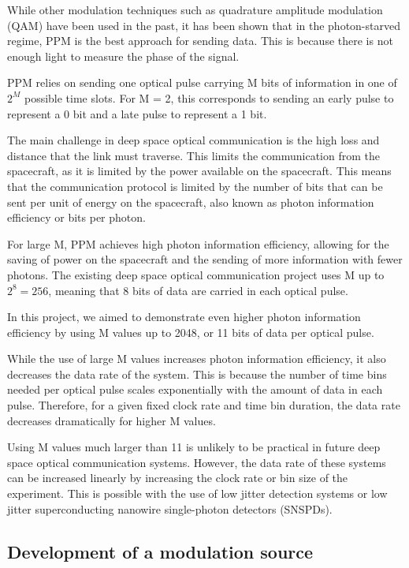 \documentclass[12pt]{caltech_thesis}
\begin{document}
While other modulation techniques such as quadrature amplitude
modulation (QAM) have been used in the past, it has been shown that in
the photon-starved regime, PPM is the best approach for sending data.
This is because there is not enough light to measure the phase of the
signal.

PPM relies on sending one optical pulse carrying M bits of information
in one of \(2^M\) possible time slots. For M = 2, this corresponds to
sending an early pulse to represent a 0 bit and a late pulse to
represent a 1 bit.

The main challenge in deep space optical communication is the high loss
and distance that the link must traverse. This limits the communication
from the spacecraft, as it is limited by the power available on the
spacecraft. This means that the communication protocol is limited by the
number of bits that can be sent per unit of energy on the spacecraft,
also known as photon information efficiency or bits per photon.

For large M, PPM achieves high photon information efficiency, allowing
for the saving of power on the spacecraft and the sending of more
information with fewer photons. The existing deep space optical
communication project uses M up to \(2^8 = 256\), meaning that 8 bits of
data are carried in each optical pulse.

In this project, we aimed to demonstrate even higher photon information
efficiency by using M values up to 2048, or 11 bits of data per optical
pulse.

While the use of large M values increases photon information efficiency,
it also decreases the data rate of the system. This is because the
number of time bins needed per optical pulse scales exponentially with
the amount of data in each pulse. Therefore, for a given fixed clock
rate and time bin duration, the data rate decreases dramatically for
higher M values.

Using M values much larger than 11 is unlikely to be practical in future
deep space optical communication systems. However, the data rate of
these systems can be increased linearly by increasing the clock rate or
bin size of the experiment. This is possible with the use of low jitter
detection systems or low jitter superconducting nanowire single-photon
detectors (SNSPDs).

\hypertarget{development-of-a-modulation-source}{%
\subsection{Development of a modulation
source}\label{development-of-a-modulation-source}}
\end{document}
